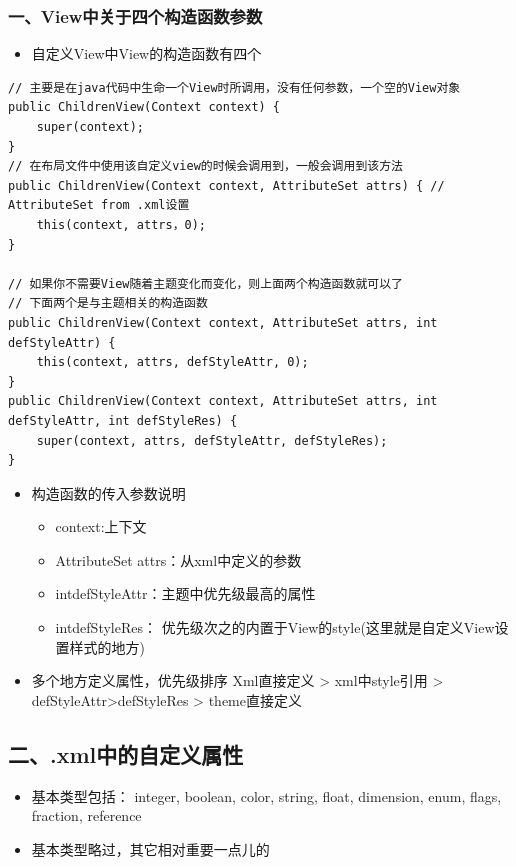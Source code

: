 \documentclass[9pt, b5paper]{article}
\begin{document}
\subsubsection{一、View中关于四个构造函数参数}
\label{sec-1-1-1}
\begin{itemize}
\item 自定义View中View的构造函数有四个
\end{itemize}
\begin{verbatim}
// 主要是在java代码中生命一个View时所调用，没有任何参数，一个空的View对象
public ChildrenView(Context context) {
    super(context);
}
// 在布局文件中使用该自定义view的时候会调用到，一般会调用到该方法
public ChildrenView(Context context, AttributeSet attrs) { // AttributeSet from .xml设置
    this(context, attrs，0);
}

// 如果你不需要View随着主题变化而变化，则上面两个构造函数就可以了
// 下面两个是与主题相关的构造函数
public ChildrenView(Context context, AttributeSet attrs, int defStyleAttr) {
    this(context, attrs, defStyleAttr, 0);
}
public ChildrenView(Context context, AttributeSet attrs, int defStyleAttr, int defStyleRes) {
    super(context, attrs, defStyleAttr, defStyleRes);
}
\end{verbatim}
\begin{itemize}
\item 构造函数的传入参数说明
\begin{itemize}
\item context:上下文
\item AttributeSet attrs：从xml中定义的参数
\item intdefStyleAttr：主题中优先级最高的属性
\item intdefStyleRes： 优先级次之的内置于View的style(这里就是自定义View设置样式的地方)
\end{itemize}
\item 多个地方定义属性，优先级排序 Xml直接定义 > xml中style引用 > defStyleAttr>defStyleRes > theme直接定义
\end{itemize}
\subsection{二、.xml中的自定义属性}
\label{sec-1-2}
\begin{itemize}
\item 基本类型包括： integer, boolean, color, string, float, dimension, enum, flags, fraction, reference
\item 基本类型略过，其它相对重要一点儿的
\end{itemize}
\end{document}
